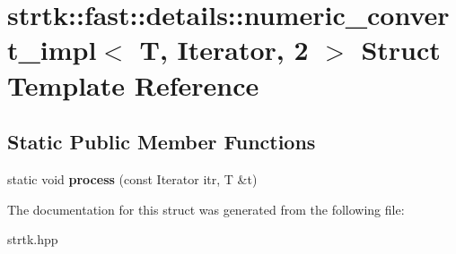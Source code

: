 \hypertarget{structstrtk_1_1fast_1_1details_1_1numeric__convert__impl_3_01T_00_01Iterator_00_012_01_4}{\section{strtk\-:\-:fast\-:\-:details\-:\-:numeric\-\_\-convert\-\_\-impl$<$ T, Iterator, 2 $>$ Struct Template Reference}
\label{structstrtk_1_1fast_1_1details_1_1numeric__convert__impl_3_01T_00_01Iterator_00_012_01_4}
}
\subsection*{Static Public Member Functions}
\begin{DoxyCompactItemize}
\item 
\hypertarget{structstrtk_1_1fast_1_1details_1_1numeric__convert__impl_3_01T_00_01Iterator_00_012_01_4_af8abace0e6ac9708f0defd3ef02ca1b4}{static void {\bfseries process} (const Iterator itr, T \&t)}\label{structstrtk_1_1fast_1_1details_1_1numeric__convert__impl_3_01T_00_01Iterator_00_012_01_4_af8abace0e6ac9708f0defd3ef02ca1b4}

\end{DoxyCompactItemize}


The documentation for this struct was generated from the following file\-:\begin{DoxyCompactItemize}
\item 
strtk.\-hpp\end{DoxyCompactItemize}
